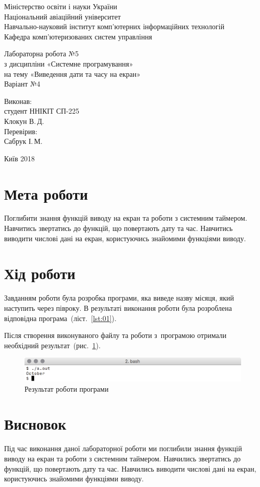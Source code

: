 \documentclass[a4paper,oneside,DIV=12,12pt,headings=normal]{scrartcl}
\begin{document}
	\begin{titlepage}
	\centering
		Міністерство освіти і науки України\\
		Національний авіаційний університет\\
		Навчально-науковий інститут комп'ютерних інформаційних технологій\\
		Кафедра комп'ютеризованих систем управління

		\vspace*{\fill}

		Лабораторна робота №5\\
		з дисципліни «Системне програмування»\\
		на тему «Виведення дати та часу на екран»\\
		Варіант №4

		\vspace*{\fill}
		
		\begin{flushright}
			Виконав:\\
			студент ННІКІТ СП-225\\
			Клокун В.\,Д.\\
			Перевірив:\\
			Сабрук І.\,М.
		\end{flushright}

		Київ 2018
    \end{titlepage}
	
	\section{Мета роботи}
		Поглибити знання функцій виводу на екран та роботи з системним таймером. Навчитись звертатись до функцій, що повертають дату та час. Навчитись виводити числові дані на екран, користуючись знайомими функціями виводу.
		
	\section{Хід роботи}
		Завданням роботи була розробка програми, яка виведе назву місяця, який наступить через півроку. В результаті виконання роботи була розроблена відповідна програма~(ліст.~\ref{lst:01}).
		
		Після створення виконуваного файлу та роботи з~програмою отримали необхідний результат~(рис.~\ref{fig:program-result-screenshot}).
		
		\begin{figure}[!htbp]
		\centering
			\includegraphics[width = \linewidth]{./assets/y02s02-sysprog-lab-05-programres.png}
		\caption{Результат роботи програми}
		\label{fig:program-result-screenshot}
		\end{figure}
		
	\section{Висновок}
		Під час виконання даної лабораторної роботи ми поглибили знання функцій виводу на екран та роботи з системним таймером. Навчились звертатись до функцій, що повертають дату та час. Навчились виводити числові дані на екран, користуючись знайомими функціями виводу.
		
\end{document}
